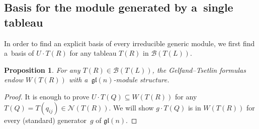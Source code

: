 \documentclass[pdftex]{sigma}
\numberwithin{equation}{section}
\newtheorem{Proposition}[Theorem]{Proposition}
{ \theoremstyle{definition}
\newtheorem{Definition}[Theorem]{Definition}
\newtheorem{Note}[Theorem]{Note}
\newtheorem{Example}[Theorem]{Example}
\newtheorem{Notation}[Theorem]{Notation}
\newtheorem{Remark}[Theorem]{Remark} }
\begin{document}
\subsection{Basis for the module generated by a~single tableau}
In order to f\/ind an explicit basis of every irreducible generic module, we f\/irst f\/ind a~basis of $U\cdot T(R)$ for any
tableau $T(R)$ in $\mathcal{B}(T(L))$.
\begin{Proposition}
\label{submodules of V(T(L))}
For any $T(R)\in\mathcal{B}(T(L))$, the Gelfand--Tsetlin formulas endow $ W(T(R))$ with a~$\mathfrak{gl}(n)$-module
structure.
\end{Proposition}
\begin{proof}
It is enough to prove $U\cdot T(Q)\subseteq W(T(R))$ for any $T(Q)=T(q_{ij})\in\mathcal{N}(T(R))$.
We will show $g\cdot T(Q)$ is in $W(T(R))$ for every (standard) generator~$g$ of $\mathfrak{gl}(n)$.


\end{proof}
\end{document}
